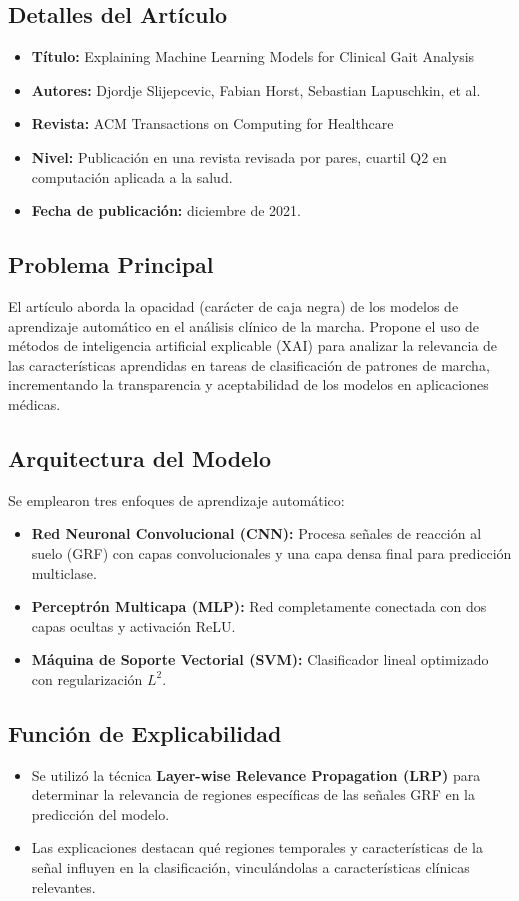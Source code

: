 \documentclass{report}
\begin{document}
\subsection{Detalles del Artículo}
\begin{itemize}
    \item \textbf{Título:} Explaining Machine Learning Models for Clinical Gait Analysis
    \item \textbf{Autores:} Djordje Slijepcevic, Fabian Horst, Sebastian Lapuschkin, et al.
    \item \textbf{Revista:} ACM Transactions on Computing for Healthcare
    \item \textbf{Nivel:} Publicación en una revista revisada por pares, cuartil Q2 en computación aplicada a la salud.
    \item \textbf{Fecha de publicación:} diciembre de 2021.
\end{itemize}

\subsection{Problema Principal}
El artículo aborda la opacidad (carácter de caja negra) de los modelos de aprendizaje automático en el análisis clínico de la marcha. Propone el uso de métodos de inteligencia artificial explicable (XAI) para analizar la relevancia de las características aprendidas en tareas de clasificación de patrones de marcha, incrementando la transparencia y aceptabilidad de los modelos en aplicaciones médicas.

\subsection{Arquitectura del Modelo}
Se emplearon tres enfoques de aprendizaje automático:
\begin{itemize}
    \item \textbf{Red Neuronal Convolucional (CNN):} Procesa señales de reacción al suelo (GRF) con capas convolucionales y una capa densa final para predicción multiclase.
    \item \textbf{Perceptrón Multicapa (MLP):} Red completamente conectada con dos capas ocultas y activación ReLU.
    \item \textbf{Máquina de Soporte Vectorial (SVM):} Clasificador lineal optimizado con regularización \( L^2 \).
\end{itemize}

\subsection{Función de Explicabilidad}
\begin{itemize}
    \item Se utilizó la técnica \textbf{Layer-wise Relevance Propagation (LRP)} para determinar la relevancia de regiones específicas de las señales GRF en la predicción del modelo.
    \item Las explicaciones destacan qué regiones temporales y características de la señal influyen en la clasificación, vinculándolas a características clínicas relevantes.
\end{itemize}
\end{document}
